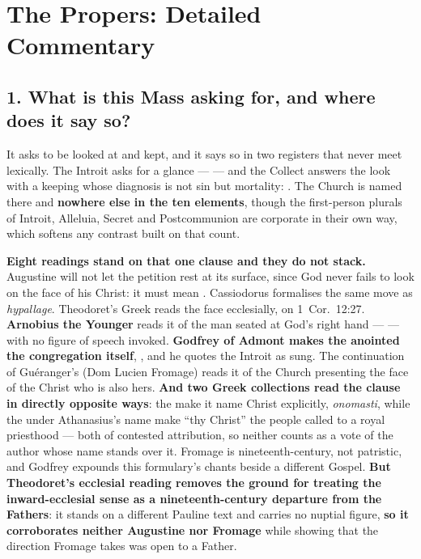 \section*{The Propers: Detailed Commentary}

\subsection*{1. What is this Mass asking for, and where does it say so?}

It asks to be looked at and kept, and it says so in two registers that never
meet lexically. The Introit asks for a glance ---  --- and the Collect answers the look with a keeping whose diagnosis
is not sin but mortality: . The
Church is named there and \textbf{nowhere else in the ten elements}, though the
first-person plurals of Introit, Alleluia, Secret and Postcommunion are
corporate in their own way, which softens any contrast built on that count.

\textbf{Eight readings stand on that one clause and they do not stack.}
Augustine will not let the petition rest at its surface, since God never fails
to look on the face of his Christ: it must mean . Cassiodorus formalises the same move as \emph{hypallage}.
Theodoret's Greek reads the face ecclesially, on 1~Cor.~12:27.
\textbf{Arnobius the Younger} reads it of the man seated at God's right hand ---
 --- with no figure of speech invoked. \textbf{Godfrey of Admont makes the
anointed the congregation itself}, , and he quotes the Introit as sung. The continuation of
Guéranger's  (Dom Lucien Fromage) reads it of
the Church presenting the face of the Christ who is also hers. \textbf{And two
Greek collections read the clause in directly opposite ways}: the  make it name Christ explicitly, \emph{onomasti}, while the
 under Athanasius's name make ``thy Christ'' the people
called to a royal priesthood --- both of contested attribution, so neither
counts as a vote of the author whose name stands over it. Fromage is
nineteenth-century, not patristic, and Godfrey expounds this formulary's chants
beside a different Gospel. \textbf{But Theodoret's ecclesial reading removes the
ground for treating the inward-ecclesial sense as a nineteenth-century departure
from the Fathers}: it stands on a different Pauline text and carries no nuptial
figure, \textbf{so it corroborates neither Augustine nor Fromage} while
showing that the direction Fromage takes was open to a Father.

